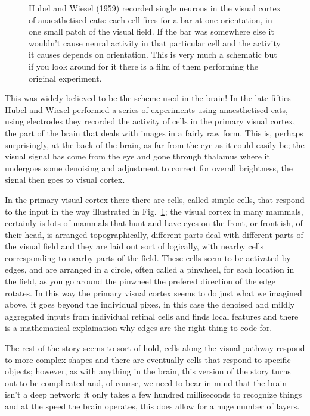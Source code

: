 \documentclass[12pt]{article}
\begin{document}
\begin{figure}
\caption{Hubel and Wiesel (1959) recorded single neurons in the visual
  cortex of anaesthetised cats: each cell fires for a bar at one
  orientation, in one small patch of the visual field. If the bar was somewhere else it wouldn't cause neural activity in that particular cell and the activity it causes depends on orientation. This is very much a schematic but if you look around for it there is a film of them performing the original experiment. \label{fig:h7w}}
\end{figure}

This was widely believed to be the scheme used in the brain! In the
late fifties Hubel and Wiesel performed a series of experiments using
anaesthetised cats, using electrodes they recorded the activity of
cells in the primary visual cortex, the part of the brain that deals
with images in a fairly raw form. This is, perhaps surprisingly, at
the back of the brain, as far from the eye as it could easily be; the
visual signal has come from the eye and gone through thalamus where it
undergoes some denoising and adjustment to correct for overall
brightness, the signal then goes to visual cortex.

In the primary visual cortex there there are cells, called simple
cells, that respond to the input in the way illustrated in
Fig.~\ref{fig:h7w}; the visual cortex in many mammals, certainly is
lots of mammals that hunt and have eyes on the front, or front-ish, of
their head, is arranged topographically, different parts deal with
different parts of the visual field and they are laid out sort of
logically, with nearby cells corresponding to nearby parts of the
field. These cells seem to be activated by edges, and are arranged in
a circle, often called a pinwheel, for each location in the field, as
you go around the pinwheel the prefered direction of the edge
rotates. In this way the primary visual cortex seems to do just what
we imagined above, it goes beyond the individual pixes, in this case
the denoised and mildly aggregated inputs from individual retinal
cells and finds local features and there is a mathematical
explaination why edges are the right thing to code for.

The rest of the story seems to sort of hold, cells along the visual
pathway respond to more complex shapes and there are eventually cells
that respond to specific objects; however, as with anything in the
brain, this version of the story turns out to be complicated and, of
course, we need to bear in mind that the brain isn't a deep network;
it only takes a few hundred milliseconds to recognize things and at
the speed the brain operates, this does allow for a huge number of
layers.
\end{document}
